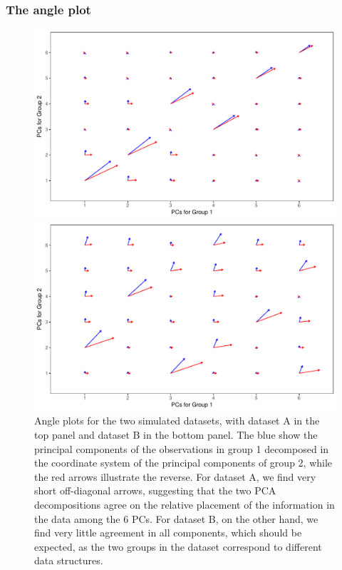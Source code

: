 \documentclass[titlepage,11pt,twoside]{article}
\begin{document}
\subsubsection{The angle plot}
\begin{figure}
\centerline{\includegraphics[scale = 0.65]{simAngle2.pdf}}
\centerline{\includegraphics[scale = 0.65]{simAngle1.pdf}}
\caption{Angle plots for the two simulated datasets, with dataset A in the top panel and dataset B in the bottom panel. The blue show the principal components of the observations in group 1 decomposed in the coordinate system of the principal components of group 2, while the red arrows illustrate the reverse. For dataset A, we find very short off-diagonal arrows, suggesting that the two PCA decompositions agree on the relative placement of the information in  the data among the 6 PCs.  For dataset B, on the other hand, we find very little agreement in all components, which should be expected, as the two groups in the dataset correspond to different data structures.}
\label{plot.simAngle}
\end{figure}
\end{document}
